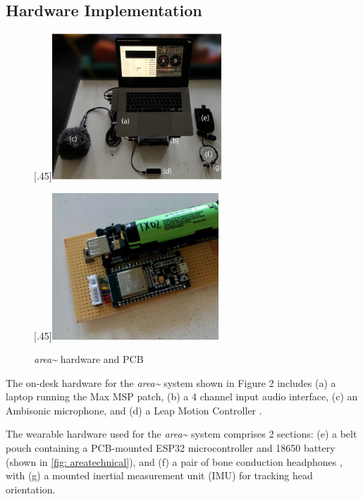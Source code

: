 \subsection{Hardware Implementation}            \label{sec: area-system-hardware}
\begin{figure}
    \centering
    \subcaptionbox*{}[.45\textwidth]{\includegraphics[height=5.5cm]{figures/05-area/areatechnical_hardware.png}}%
    
    \subcaptionbox*{}[.45\textwidth]{\includegraphics[height=5.5cm]{figures/05-area/areatechnical_pcb.png}}%
    \caption{\textit{area\textasciitilde{}} hardware and PCB}
    \label{fig: areatechnical}
\end{figure}

The on-desk hardware for the \textit{area\textasciitilde{}} system shown in Figure 2 includes (a) a laptop running the Max MSP \citep{cycling742020} patch, (b) a 4 channel input audio interface, (c) an Ambisonic microphone, and (d) a Leap Motion Controller \citep{ultraleap2020}.

The wearable hardware used for the \textit{area\textasciitilde{}} system comprises 2 sections: (e) a belt pouch containing a PCB-mounted ESP32 microcontroller \citep{espressif2020} and 18650 battery (shown in \autoref{fig: areatechnical}), and (f) a pair of bone conduction headphones \citep{aftershokz2020}, with (g) a mounted inertial measurement unit (IMU) for tracking head orientation. 

